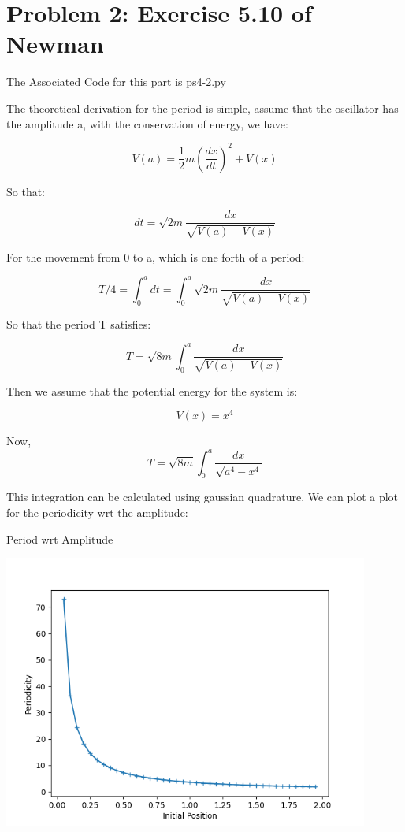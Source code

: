 \documentclass[letterpaper,12pt]{article}
\begin{document}
\section{Problem 2: Exercise 5.10 of Newman}

The Associated Code for this part is ps4-2.py

The theoretical derivation for the period is simple, assume that the oscillator has the amplitude a, with the conservation of energy, we have:

\begin{equation}
    V(a) = \frac{1}{2}m(\frac{dx}{dt})^2 + V(x)
\end{equation}

So that:

\begin{equation}
    dt = \sqrt{2m}\frac{dx}{\sqrt{V(a)-V(x)}}
\end{equation}

For the movement from 0 to a, which is one forth of a period:

\begin{equation}
    T/4 = \int_0^a dt = \int_0^a \sqrt{2m}\frac{dx}{\sqrt{V(a)-V(x)}}
\end{equation}

So that the period T satisfies:

\begin{equation}
    T = \sqrt{8m} \int_0^a \frac{dx}{\sqrt{V(a)-V(x)}}
\end{equation}

Then we assume that the potential energy for the system is:

\begin{equation}
    V(x) = x^4
\end{equation}

Now,
\begin{equation}
    T = \sqrt{8m} \int_0^a \frac{dx}{\sqrt{a^4-x^4}}
\end{equation}

This integration can be calculated using gaussian quadrature. We can plot a plot for the periodicity wrt the amplitude:


\begin{table}[!h]
    \centering
    \caption{Period wrt Amplitude}
    \includegraphics[width=12cm]{ps4-2-2.png}
\end{table}%
\end{document}
